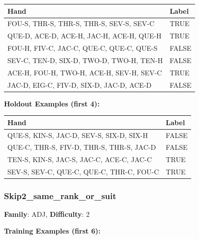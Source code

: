\documentclass[10pt,a4paper]{article}
\begin{document}
\begin{small}
\begin{tabular}{p{8cm}l}
\toprule
Hand & Label \\
\midrule
FOU-S, THR-S, THR-S, THR-S, SEV-S, SEV-C & \textcolor{positive}{TRUE} \\
QUE-D, ACE-D, ACE-H, JAC-H, ACE-H, QUE-H & \textcolor{positive}{TRUE} \\
FOU-H, FIV-C, JAC-C, QUE-C, QUE-C, QUE-S & \textcolor{negative}{FALSE} \\
SEV-C, TEN-D, SIX-D, TWO-D, TWO-H, TEN-H & \textcolor{negative}{FALSE} \\
ACE-H, FOU-H, TWO-H, ACE-H, SEV-H, SEV-C & \textcolor{positive}{TRUE} \\
JAC-D, EIG-C, FIV-D, SIX-D, JAC-D, ACE-D & \textcolor{negative}{FALSE} \\
\bottomrule
\end{tabular}
\end{small}

\textbf{Holdout Examples (first 4):}

\begin{small}
\begin{tabular}{p{8cm}l}
\toprule
Hand & Label \\
\midrule
QUE-S, KIN-S, JAC-D, SEV-S, SIX-D, SIX-H & \textcolor{negative}{FALSE} \\
QUE-C, THR-S, FIV-D, THR-S, THR-S, JAC-D & \textcolor{negative}{FALSE} \\
TEN-S, KIN-S, JAC-S, JAC-C, ACE-C, JAC-C & \textcolor{positive}{TRUE} \\
SEV-S, SEV-C, QUE-C, QUE-C, THR-C, FOU-C & \textcolor{positive}{TRUE} \\
\bottomrule
\end{tabular}
\end{small}

\vspace{0.5cm}

\subsubsection{Skip2\_same\_rank\_or\_suit}

\textbf{Family}: ADJ, \textbf{Difficulty}: 2

\textbf{Training Examples (first 6):}
\end{document}

